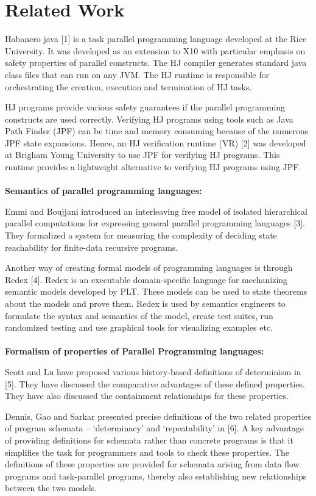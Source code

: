 \section{Related Work}

Habanero java [1] is a task parallel programming language developed at the Rice University. It was developed as an extension to X10 with particular emphasis on safety properties of parallel constructs. The HJ compiler generates standard java class files that can run on any JVM. The HJ runtime is responsible for orchestrating the creation, execution and termination of HJ tasks.

HJ programs provide various safety guarantees if the parallel programming constructs are used correctly. Verifying HJ programs using tools such as Java Path Finder (JPF) can be time and memory consuming because of the numerous JPF state expansions. Hence, an HJ verification runtime (VR) [2] was developed at Brigham Young University to use JPF for verifying HJ programs. This runtime provides a lightweight alternative to verifying HJ programs using JPF.\\
\\
\textbf{Semantics of parallel programming languages:}

Emmi and Boujjani introduced an interleaving free model of isolated hierarchical parallel computations for expressing general parallel programming languages [3]. They formalized a system for measuring the complexity of deciding state reachability for finite-data recursive programs.

Another way of creating formal models of programming languages is through Redex [4]. Redex is an executable domain-specific language for mechanizing semantic models developed by PLT. These models can be used to state theorems about the models and prove them. Redex is used by semantics engineers to formulate the syntax and semantics of the model, create test suites, run randomized testing and use graphical tools for visualizing examples etc.\\
\\
\textbf{Formalism of properties of Parallel Programming languages:}

Scott and Lu have proposed various history-based definitions of determinism in [5]. They have discussed the comparative advantages of these defined properties. They have also discussed the containment relationships for these properties.

Dennis, Gao and Sarkar presented precise definitions of the two related properties of program schemata – ‘determinacy’ and ‘repeatability’ in [6]. A key advantage of providing definitions for schemata rather than concrete programs is that it simplifies the task for programmers and tools to check these properties. The definitions of these properties are provided for schemata arising from data flow programs and task-parallel programs, thereby also establishing new relationships between the two models.

